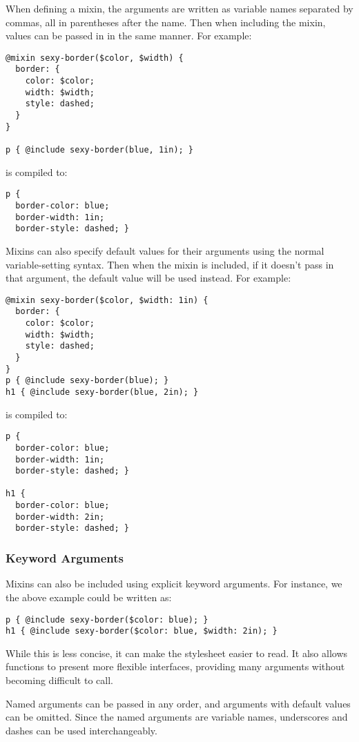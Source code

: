 \documentclass[10pt]{article}
\begin{document}
 When defining a mixin, the arguments are written as variable names separated by commas, all in parentheses after the name. Then when including the mixin, values can be passed in in the same manner. For example:
\begin{verbatim}
@mixin sexy-border($color, $width) {
  border: {
    color: $color;
    width: $width;
    style: dashed;
  }
}

p { @include sexy-border(blue, 1in); }
\end{verbatim}


 is compiled to:
\begin{verbatim}
p {
  border-color: blue;
  border-width: 1in;
  border-style: dashed; }
\end{verbatim}


 Mixins can also specify default values for their arguments using the normal variable-setting syntax. Then when the mixin is included, if it doesn’t pass in that argument, the default value will be used instead. For example:
\begin{verbatim}
@mixin sexy-border($color, $width: 1in) {
  border: {
    color: $color;
    width: $width;
    style: dashed;
  }
}
p { @include sexy-border(blue); }
h1 { @include sexy-border(blue, 2in); }
\end{verbatim}


 is compiled to:
\begin{verbatim}
p {
  border-color: blue;
  border-width: 1in;
  border-style: dashed; }

h1 {
  border-color: blue;
  border-width: 2in;
  border-style: dashed; }
\end{verbatim}
\subsubsection{Keyword Arguments}


 Mixins can also be included using explicit keyword arguments. For instance, we the above example could be written as:
\begin{verbatim}
p { @include sexy-border($color: blue); }
h1 { @include sexy-border($color: blue, $width: 2in); }
\end{verbatim}


 While this is less concise, it can make the stylesheet easier to read. It also allows functions to present more flexible interfaces, providing many arguments without becoming difficult to call.


 Named arguments can be passed in any order, and arguments with default values can be omitted. Since the named arguments are variable names, underscores and dashes can be used interchangeably.
\end{document}

